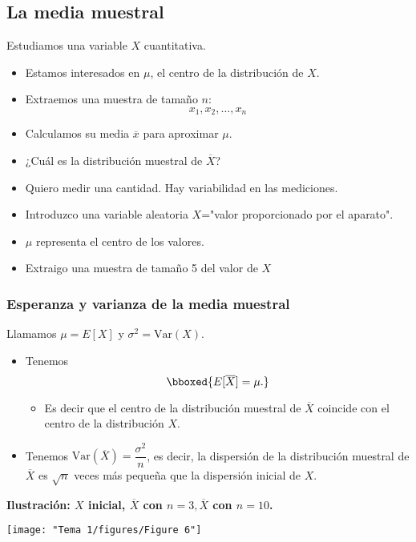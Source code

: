 \subsection{La media muestral}
\begin{tcolorbox}[colback=blue!5!white, colframe=blue!75!black, title=\textbf{Contexto}]
Estudiamos una variable $X$ cuantitativa.
\begin{itemize}[label=\textbullet]
  \item Estamos interesados en $\mu$, el centro de la distribución de $X$.
  \item Extraemos una muestra de tamaño  $n$:  \[
  x_1,x_2,\dots,x_{n}
  \] 
\item Calculamos su media $\overline{x}$ para aproximar  $\mu$.
\item ¿Cuál es la distribución muestral de $\overline{X}$?
\end{itemize}
\end{tcolorbox}
\Ej
\begin{itemize}[label=\textbullet]
  \item Quiero medir una cantidad. Hay variabilidad en las mediciones.
  \item Introduzco una variable aleatoria $X$="valor proporcionado por el aparato".
  \item  $\mu$ representa el centro de los valores.
  \item Extraigo una muestra de tamaño 5 del valor de $X$
\end{itemize}
\subsubsection{Esperanza y varianza de la media muestral}
Llamamos $\mu=E[X]$ y $\sigma^2=\mathrm{Var}(X)$.
\begin{itemize}[label=\textbullet]
  \item Tenemos \[
      \bboxed{E[\overline{X}]=\mu.} 
  \] 
  \begin{itemize}[label=\textrightarrow]
    \item Es decir que el centro de la distribución muestral de $\overline{X}$ coincide con el centro de la distribución  $X$.
  \end{itemize}
\item Tenemos $\mathrm{Var}(\overline{X})=\dfrac{\sigma^2}{n}$, es decir, la dispersión de la distribución muestral de $\overline{X}$ es  $\sqrt{n} $ veces más pequeña que la dispersión inicial de $X$.
\end{itemize}
\textbf{Ilustración: $X$ inicial,  $\overline{X}$ con  $n=3, \overline{X} $ con $n=10$.}
\begin{center}
  \texttt{[image: "Tema 1/figures/Figure 6"]}
\end{center}
